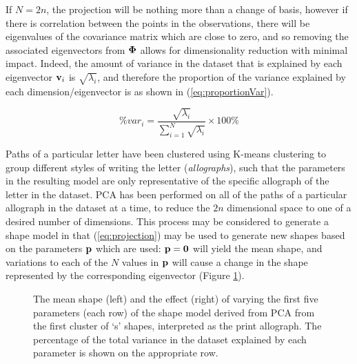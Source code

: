 \documentclass{sig-alternate}
\begin{document}
If $N = 2n$, the projection will be nothing more than a change of basis, however
if there is correlation between the points in the observations, there will be
eigenvalues of the covariance matrix which are close to zero, and so removing
the associated eigenvectors from ${\bf \Phi}$ allows for dimensionality
reduction with minimal impact. Indeed, the amount of variance in the dataset
that is explained by each eigenvector ${\bf v}_i$ is $\sqrt{\lambda_i}$, and
therefore the proportion of the variance explained by each dimension/eigenvector
is as shown in (\ref{eq:proportionVar}).

\begin{equation}\label{eq:proportionVar}
\%var_i = \frac{\sqrt{\lambda_i}}{\sum_{i=1}^{N}\sqrt{\lambda_i}}\times 100\%
\end{equation}

Paths of a particular letter have been clustered using K-means clustering to
group different styles of writing the letter (\emph{allographs}), such that the
parameters in the resulting model are only representative of the specific
allograph of the letter in the dataset. PCA has been performed on all of the
paths of a particular allograph in the dataset at a time, to reduce the $2n$
dimensional space to one of a desired number of dimensions. This process may be
considered to generate a shape model in that (\ref{eq:projection}) may be used
to generate new shapes based on the parameters ${\bf p}$ which are used: ${\bf
p}={\bf 0}$ will yield the mean shape, and variations to each of the $N$ values
in ${\bf p}$ will cause a change in the shape represented by the corresponding
eigenvector (Figure \ref{fig:deviations_sPrint}). 

\begin{figure}[thpb]
\centering
{}
\caption[The mean shape and the effect of varying the first five parameters of
the shape model derived from PCA from the dataset of print `s'
shapes.]{\label{fig:deviations_sPrint}The mean shape (left) and the effect
(right) of varying the first five parameters (each row) of the shape model
derived from PCA from the first cluster of `s' shapes, interpreted as the print
allograph. The percentage of the total variance in the dataset explained by each
parameter is shown on the appropriate row. }

\end{figure}
\end{document}
